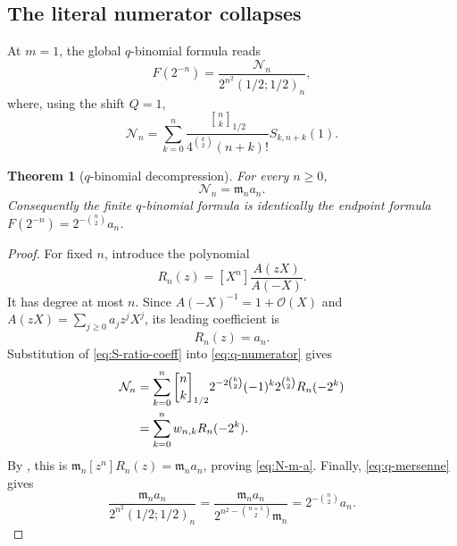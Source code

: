 \documentclass[11pt,oneside]{article}
\newtheorem{theorem}{Theorem}[section]
\theoremstyle{definition}
\theoremstyle{remark}
\newcommand{\bigO}{\mathcal O}
\newcommand{\qbinom}[3]{\genfrac{[}{]}{0pt}{}{#1}{#2}_{#3}}
\newcommand{\M}{\mathfrak m}
\begin{document}
\subsection{The literal numerator collapses}

At $m=1$, the global $q$-binomial formula reads
\begin{equation}
 F(2^{-n})=\frac{\mathcal N_n}
 {2^{n^2}(1/2;1/2)_n},                                     \label{eq:q-F-N}
\end{equation}
where, using the shift $Q=1$,
\begin{equation}
 \mathcal N_n=
 \sum_{k=0}^n
 \frac{\qbinom nk{1/2}}{4^{\binom k2}(n+k)!}
 S_{k,n+k}(1).                                              \label{eq:q-numerator}
\end{equation}

\begin{theorem}[$q$-binomial decompression]
\label{thm:q-decompression}
For every $n\ge0$,
\begin{equation}
 \boxed{\mathcal N_n=\M_na_n.}                             \label{eq:N-m-a}
\end{equation}
Consequently the finite $q$-binomial formula is identically the endpoint formula
$F(2^{-n})=2^{-\binom n2}a_n$.
\end{theorem}

\begin{proof}
For fixed $n$, introduce the polynomial
\begin{equation}
 R_n(z)=[X^n]\frac{A(zX)}{A(-X)}.                           \label{eq:Rn}
\end{equation}
It has degree at most $n$.  Since $A(-X)^{-1}=1+\bigO(X)$ and
$A(zX)=\sum_{j\ge0}a_jz^jX^j$, its leading coefficient is
\begin{equation}
 [z^n]R_n(z)=a_n.                                           \label{eq:Rn-leading}
\end{equation}
Substitution of \eqref{eq:S-ratio-coeff} into \eqref{eq:q-numerator} gives
\begin{align}
 \mathcal N_n
 &=\sum_{k=0}^n
 \qbinom nk{1/2}2^{-2\binom k2}
 (-1)^k2^{\binom k2}R_n(-2^k)                              \notag\\
 &=\sum_{k=0}^n w_{n,k}R_n(-2^k).                          \label{eq:N-interpolation}
\end{align}
By , this is $\M_n[z^n]R_n(z)=\M_na_n$, proving
\eqref{eq:N-m-a}.  Finally, \eqref{eq:q-mersenne} gives
\begin{equation*}
 \frac{\M_na_n}{2^{n^2}(1/2;1/2)_n}
 =\frac{\M_na_n}{2^{n^2-\binom{n+1}{2}}\M_n}
 =2^{-\binom n2}a_n.
\end{equation*}
\end{proof}
\end{document}
